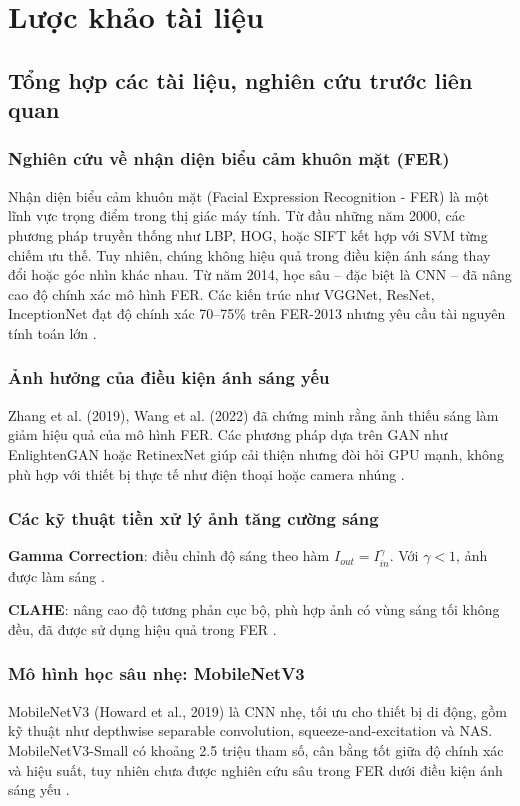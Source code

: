 \section{Lược khảo tài liệu} %
\subsection{Tổng hợp các tài liệu, nghiên cứu trước liên quan}

\subsubsection{Nghiên cứu về nhận diện biểu cảm khuôn mặt (FER)}
Nhận diện biểu cảm khuôn mặt (Facial Expression Recognition - FER) là một lĩnh vực trọng điểm trong thị giác máy tính. Từ đầu những năm 2000, các phương pháp truyền thống như LBP, HOG, hoặc SIFT kết hợp với SVM từng chiếm ưu thế. Tuy nhiên, chúng không hiệu quả trong điều kiện ánh sáng thay đổi hoặc góc nhìn khác nhau. Từ năm 2014, học sâu – đặc biệt là CNN – đã nâng cao độ chính xác mô hình FER. Các kiến trúc như VGGNet, ResNet, InceptionNet đạt độ chính xác 70--75\% trên FER-2013 nhưng yêu cầu tài nguyên tính toán lớn \cite{goodfellow2013challenges}.

\subsubsection{Ảnh hưởng của điều kiện ánh sáng yếu}
Zhang et al. (2019), Wang et al. (2022) đã chứng minh rằng ảnh thiếu sáng làm giảm hiệu quả của mô hình FER. Các phương pháp dựa trên GAN như EnlightenGAN hoặc RetinexNet giúp cải thiện nhưng đòi hỏi GPU mạnh, không phù hợp với thiết bị thực tế như điện thoại hoặc camera nhúng \cite{zhang2019ganfer, wang2022lowlight}.

\subsubsection{Các kỹ thuật tiền xử lý ảnh tăng cường sáng}
\textbf{Gamma Correction}: điều chỉnh độ sáng theo hàm \(I_{out} = I_{in}^\gamma\). Với \(\gamma < 1\), ảnh được làm sáng \cite{ying2017gamma}.\par
\textbf{CLAHE}: nâng cao độ tương phản cục bộ, phù hợp ảnh có vùng sáng tối không đều, đã được sử dụng hiệu quả trong FER \cite{pizer1987clahe}.

\subsubsection{Mô hình học sâu nhẹ: MobileNetV3}
MobileNetV3 (Howard et al., 2019) là CNN nhẹ, tối ưu cho thiết bị di động, gồm kỹ thuật như depthwise separable convolution, squeeze-and-excitation và NAS. MobileNetV3-Small có khoảng 2.5 triệu tham số, cân bằng tốt giữa độ chính xác và hiệu suất, tuy nhiên chưa được nghiên cứu sâu trong FER dưới điều kiện ánh sáng yếu \cite{howard2019mobilenetv3, sandler2018mobilenetv2, hu2018squeeze}.


